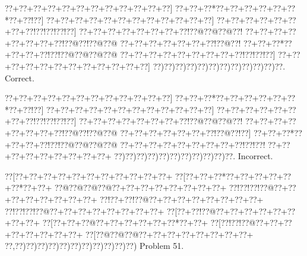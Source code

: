 \documentclass[a5paper]{article}
\begin{document}
\begin{center}
{\goo
\0??+\0??+\0??+\0??+\0??+\0??+\0??+\0??+\0??+\0??+\0??+\0??]
\0??+\0??+\0??*\0??+\0??+\0??+\0??+\0??+\0??*\0??+\0??!\0??]
\0??+\0??+\0??+\0??+\0??+\0??+\0??+\0??+\0??+\0??+\0??+\0??]
\0??+\0??+\0??+\0??+\0??+\0??+\0??+\0??!\0??!\0??!\0??!\0??]
\0??+\0??+\0??+\0??+\0??+\0??+\0??+\0??!\0??@\0??@\0??@\0??!
\0??+\0??+\0??+\0??+\0??+\0??+\0??+\0??!\0??@\0??!\0??@\0??@
\0??+\0??+\0??+\0??+\0??+\0??+\0??!\0??@\0??!
\0??+\0??+\0??*\0??+\0??+\0??+\0??!\0??!\0??@\0??@\0??@\0??@
\0??+\0??+\0??+\0??+\0??+\0??+\0??+\0??+\0??!\0??!\0??!\0??]
\0??+\0??+\0??+\0??+\0??+\0??+\0??+\0??+\0??+\0??+\0??+\0??]
\0??)\0??)\0??)\0??)\0??)\0??)\0??)\0??)\0??)\0??)\0??)\0??.
}
Correct. 

\end{center}
\begin{center}
{\goo
\0??+\0??+\0??+\0??+\0??+\0??+\0??+\0??+\0??+\0??+\0??+\0??]
\0??+\0??+\0??*\0??+\0??+\0??+\0??+\0??+\0??*\0??+\0??!\0??]
\0??+\0??+\0??+\0??+\0??+\0??+\0??+\0??+\0??+\0??+\0??+\0??]
\0??+\0??+\0??+\0??+\0??+\0??+\0??+\0??!\0??!\0??!\0??!\0??]
\0??+\0??+\0??+\0??+\0??+\0??+\0??+\0??!\0??@\0??@\0??@\0??!
\0??+\0??+\0??+\0??+\0??+\0??+\0??+\0??!\0??@\0??!\0??@\0??@
\0??+\0??+\0??+\0??+\0??+\0??+\0??!\0??@\0??!\0??]
\0??+\0??+\0??*\0??+\0??+\0??+\0??!\0??!\0??@\0??@\0??@\0??@
\0??+\0??+\0??+\0??+\0??+\0??+\0??+\0??+\0??!\0??!\0??!
\0??+\0??+\0??+\0??+\0??+\0??+\0??+\0??+\0??+
\0??)\0??)\0??)\0??)\0??)\0??)\0??)\0??)\0??)\0??)\0??.
}
Incorrect. 

\end{center}
\newpage
\begin{center}
{\goo
\0??[\0??+\0??+\0??+\0??+\0??+\0??+\0??+\0??+\0??+\0??+\0??+
\0??[\0??+\0??+\0??*\0??+\0??+\0??+\0??+\0??+\0??*\0??+\0??+
\0??@\0??@\0??@\0??@\0??+\0??+\0??+\0??+\0??+\0??+\0??+\0??+
\0??!\0??!\0??!\0??@\0??+\0??+\0??+\0??+\0??+\0??+\0??+\0??+
\0??!\0??+\0??!\0??@\0??+\0??+\0??+\0??+\0??+\0??+\0??+\0??+
\0??!\0??!\0??!\0??@\0??+\0??+\0??+\0??+\0??+\0??+\0??+\0??+
\0??[\0??+\0??!\0??@\0??+\0??+\0??+\0??+\0??+\0??+\0??+\0??+
\0??[\0??+\0??+\0??@\0??+\0??+\0??+\0??+\0??+\0??*\0??+\0??+
\0??[\0??!\0??!\0??@\0??+\0??+\0??+\0??+\0??+\0??+\0??+\0??+
\0??[\0??@\0??@\0??@\0??+\0??+\0??+\0??+\0??+\0??+\0??+\0??+
\0??,\0??)\0??)\0??)\0??)\0??)\0??)\0??)\0??)\0??)\0??)\0??)
}
Problem 51.

\end{center}
\end{document}
